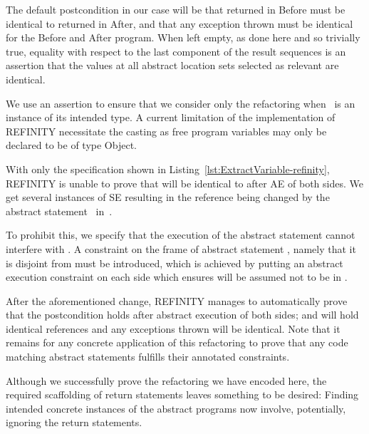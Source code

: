 The default postcondition in our case will be that  returned in Before must be identical to  returned in After, and that any exception thrown must be identical for the
Before and After program. When left empty, as done here and so
trivially true, equality with respect to the last component of the result sequences is an assertion that the values at all abstract location sets selected as relevant are identical.

We use an assertion to ensure that we consider only the refactoring when~ is an instance of its intended type.
A current limitation of the implementation of REFINITY necessitate the casting  as free program variables may only be declared to be of type Object.

With only the specification shown in Listing~\ref{lst:ExtractVariable-refinity}, REFINITY is unable to prove that  will be identical to  after AE of both sides.
We get several instances of SE resulting in the reference  being changed by the abstract statement~ in~.

To prohibit this, we specify that the execution of the abstract statement  cannot interfere with .
A constraint on the frame  of abstract statement ,
namely that it is disjoint from  must be introduced, which is
achieved by putting an abstract execution constraint  on each side which ensures 
will be assumed not to be in .

After the aforementioned change, REFINITY manages to automatically prove that the postcondition holds after abstract execution of both sides;
 and  will hold identical references and any exceptions thrown will be identical.
Note that it remains for any concrete application of this refactoring to prove that any code matching abstract statements fulfills their annotated constraints.

Although we successfully prove the refactoring we have encoded here, the required scaffolding of return statements leaves something to be desired:
Finding intended concrete instances of the abstract programs now involve, potentially, ignoring the return statements.
